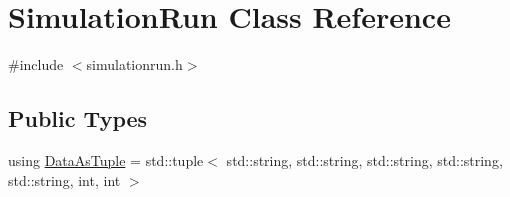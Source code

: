 \hypertarget{class_simulation_run}{}\section{Simulation\+Run Class Reference}
\label{class_simulation_run}


{\ttfamily \#include $<$simulationrun.\+h$>$}

\subsection*{Public Types}
\begin{DoxyCompactItemize}
\item 
using \mbox{\hyperlink{class_simulation_run_a0088973963e3846e2543a2b14c686d7b}{Data\+As\+Tuple}} = std\+::tuple$<$ std\+::string, std\+::string, std\+::string, std\+::string, std\+::string, int, int $>$
\end{DoxyCompactItemize}
